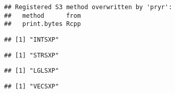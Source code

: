 \begin{verbatim}
## Registered S3 method overwritten by 'pryr':
##   method      from
##   print.bytes Rcpp
\end{verbatim}

\begin{Shaded}
\begin{Highlighting}[]
\end{Highlighting}
\end{Shaded}

\begin{verbatim}
## [1] "INTSXP"
\end{verbatim}

\begin{Shaded}
\begin{Highlighting}[]
\NormalTok{(}\NormalTok{)}
\end{Highlighting}
\end{Shaded}

\begin{verbatim}
## [1] "STRSXP"
\end{verbatim}

\begin{Shaded}
\begin{Highlighting}[]
\end{Highlighting}
\end{Shaded}

\begin{verbatim}
## [1] "LGLSXP"
\end{verbatim}

\begin{Shaded}
\begin{Highlighting}[]
\NormalTok{(}\NormalTok{(} \NormalTok{))}
\end{Highlighting}
\end{Shaded}

\begin{verbatim}
## [1] "VECSXP"
\end{verbatim}

\begin{Shaded}
\begin{Highlighting}[]
\NormalTok{(}\NormalTok{(} \NormalTok{))}
\end{Highlighting}
\end{Shaded}

